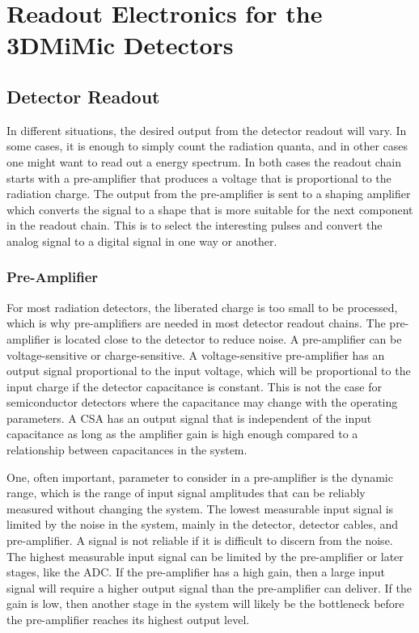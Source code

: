 \documentclass[../main/thesis.tex]{subfiles}
\begin{document}
\newchapter

\chapter{Readout Electronics for the 3DMiMic Detectors}
\label{e}
 

\section{Detector Readout}
\label{t-read}
In different situations, the desired output from the detector readout will vary. In some cases, it is enough to simply count the radiation quanta, and in other cases one might want to read out a energy spectrum. In both cases the readout chain starts with a pre-amplifier that produces a voltage that is proportional to the radiation charge. The output from the pre-amplifier is sent to a shaping amplifier which converts the signal to a shape that is more suitable for the next component in the readout chain. This is to select the interesting pulses and convert the analog signal to a digital signal in one way or another. \citep[chap. 16]{Knoll}

\subsection{Pre-Amplifier}
\label{t-amp}
For most radiation detectors, the liberated charge is too small to be processed, which is why pre-amplifiers are needed in most detector readout chains. The pre-amplifier is located close to the detector to reduce noise. A pre-amplifier can be voltage-sensitive or charge-sensitive. A voltage-sensitive pre-amplifier has an output signal proportional to the input voltage, which will be proportional to the input charge if the detector capacitance is constant. This is not the case for semiconductor detectors where the capacitance may change with the operating parameters. A \gls{CSA} has an output signal that is independent of the input capacitance as long as the amplifier gain is high enough compared to a relationship between capacitances in the system. \citep[chap. 16]{Knoll}

One, often important, parameter to consider in a pre-amplifier is the dynamic range, which is the range of input signal amplitudes that can be reliably measured without changing the system. The lowest measurable input signal is limited by the noise in the system, mainly in the detector, detector cables, and pre-amplifier. A signal is not reliable if it is difficult to discern from the noise. The highest measurable input signal can be limited by the pre-amplifier or later stages, like the \gls{ADC}. If the pre-amplifier has a high gain, then a large input signal will require a higher output signal than the pre-amplifier can deliver. If the gain is low, then another stage in the system will likely be the bottleneck before the pre-amplifier reaches its highest output level. \citep{dynamic-range}
\end{document}
